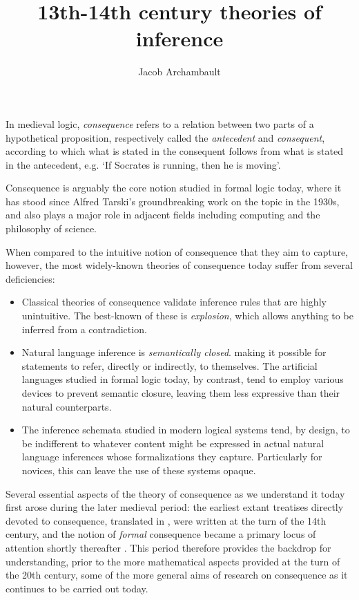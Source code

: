 \documentclass[]{article}
\title{13th-14th century theories of inference}
\author{Jacob Archambault}
\begin{document}
\maketitle

In medieval logic, 
\emph{consequence} refers to a relation between two parts of a hypothetical proposition, 
respectively called the \emph{antecedent} and \emph{consequent}, 
according to which what is stated in the consequent follows from what is stated in the antecedent, 
e.g. `If Socrates is running, then he is moving'. 

Consequence is arguably the core notion studied in formal logic today, 
where it has stood since Alfred Tarski's groundbreaking work on the topic in the 1930s, 
and also plays a major role in adjacent fields including computing and the philosophy of science. 

When compared to the intuitive notion of consequence that they aim to capture, 
however, 
the most widely-known theories of consequence today suffer from several deficiencies: 
\begin{itemize}
	\item Classical theories of consequence validate inference rules that are highly unintuitive. 
	The best-known of these is \emph{explosion}, 
	which allows anything to be inferred from a contradiction.
	\item Natural language inference is \emph{semantically closed}. 
	making it possible for statements to refer, 
	directly or indirectly, 
	to themselves. 
	The artificial languages studied in formal logic today, 
	by contrast, 
	tend to employ various devices to prevent semantic closure, 
	leaving them less expressive than their natural counterparts.
	\item The inference schemata studied in modern logical systems tend, 
	by design, 
	to be indifferent to whatever content might be expressed in actual natural language inferences whose formalizations they capture.
	Particularly for novices, this can leave the use of these systems opaque. 
\end{itemize}

Several essential aspects of the theory of consequence as we understand it today first arose during the later medieval period: 
the earliest extant treatises directly devoted to consequence, 
translated in \autocite{Archambault2017d}, 
were written at the turn of the 14th century, 
and the notion of \emph{formal} consequence became a primary locus of attention shortly thereafter \autocite{sep-consequence-medieval}. 
This period therefore provides the backdrop for understanding, 
prior to the more mathematical aspects provided at the turn of the 20th century, 
some of the more general aims of research on consequence as it continues to be carried out today. 
\end{document}
